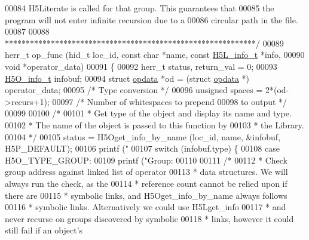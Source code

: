 \begin{DoxyCode}
00084 \textcolor{comment}{  H5Literate is called for that group.  This guarantees that}
00085 \textcolor{comment}{  the program will not enter infinite recursion due to a}
00086 \textcolor{comment}{  circular path in the file.}
00087 \textcolor{comment}{}
00088 \textcolor{comment}{ ************************************************************/}
00089 herr\_t op\_func (hid\_t loc\_id, \textcolor{keyword}{const} \textcolor{keywordtype}{char} *name, \textcolor{keyword}{const} \hyperlink{struct_h5_l__info__t}{H5L\_info\_t} *info,
00090             \textcolor{keywordtype}{void} *operator\_data)
00091 \{
00092     herr\_t          status, return\_val = 0;
00093     \hyperlink{struct_h5_o__info__t}{H5O\_info\_t}      infobuf;
00094     \textcolor{keyword}{struct }\hyperlink{structopdata}{opdata}   *od = (\textcolor{keyword}{struct }\hyperlink{structopdata}{opdata} *) operator\_data;
00095                                 \textcolor{comment}{/* Type conversion */}
00096     \textcolor{keywordtype}{unsigned}        spaces = 2*(od->recurs+1);
00097                                 \textcolor{comment}{/* Number of whitespaces to prepend}
00098 \textcolor{comment}{                                   to output */}
00099 
00100     \textcolor{comment}{/*}
00101 \textcolor{comment}{     * Get type of the object and display its name and type.}
00102 \textcolor{comment}{     * The name of the object is passed to this function by}
00103 \textcolor{comment}{     * the Library.}
00104 \textcolor{comment}{     */}
00105     status = H5Oget\_info\_by\_name (loc\_id, name, &infobuf, H5P\_DEFAULT);
00106     printf (\textcolor{stringliteral}{"%
00107     \textcolor{keywordflow}{switch} (infobuf.type) \{
00108         \textcolor{keywordflow}{case} H5O\_TYPE\_GROUP:
00109             printf (\textcolor{stringliteral}{"Group: %
00110 
00111             \textcolor{comment}{/*}
00112 \textcolor{comment}{             * Check group address against linked list of operator}
00113 \textcolor{comment}{             * data structures.  We will always run the check, as the}
00114 \textcolor{comment}{             * reference count cannot be relied upon if there are}
00115 \textcolor{comment}{             * symbolic links, and H5Oget\_info\_by\_name always follows}
00116 \textcolor{comment}{             * symbolic links.  Alternatively we could use H5Lget\_info}
00117 \textcolor{comment}{             * and never recurse on groups discovered by symbolic}
00118 \textcolor{comment}{             * links, however it could still fail if an object's}
}}
\end{DoxyCode}
